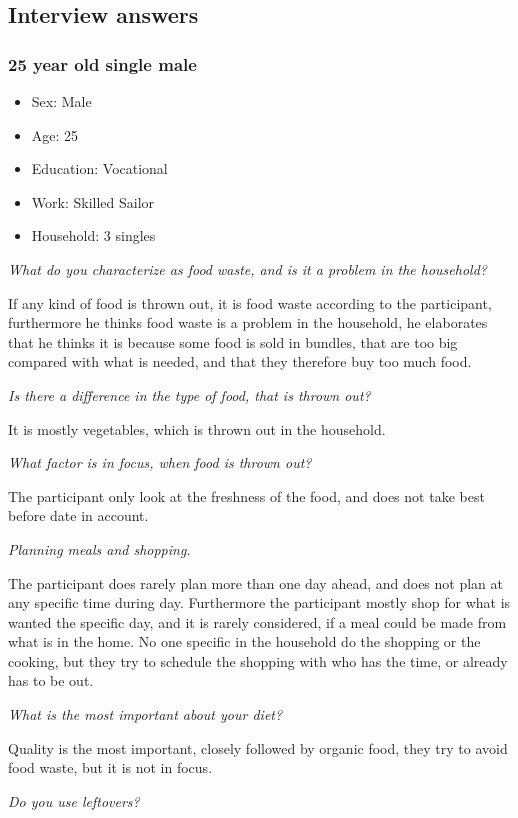 \subsection{Interview answers}\label{Interview}
\subsubsection{25 year old single male}
\begin{itemize}
  \item Sex: Male
  \item Age: 25
  \item Education: Vocational
  \item Work: Skilled Sailor
  \item Household: 3 singles
\end{itemize}
\emph{What do you characterize as food waste, and is it a problem in the household?}

If any kind of food is thrown out, it is food waste according to the participant, furthermore he thinks food waste is a problem in the household, he elaborates that he thinks it is because some food is sold in bundles, that are too big compared with what is needed, and that they therefore buy too much food.

\emph{Is there a difference in the type of food, that is thrown out?}

It is mostly vegetables, which is thrown out in the household.

\emph{What factor is in focus, when food is thrown out?}

The participant only look at the freshness of the food, and does not take best before date in account.

\emph{Planning meals and shopping.}

The participant does rarely plan more than one day ahead, and does not plan at any specific time during day. Furthermore the participant mostly shop for what is wanted the specific day, and it is rarely considered, if a meal could be made from what is in the home. No one specific in the household do the shopping or the cooking, but they try to schedule the shopping with who has the time, or already has to be out.

\emph{What is the most important about your diet?}

Quality is the most important, closely followed by organic food, they try to avoid food waste, but it is not in focus.

\emph{Do you use leftovers?}

